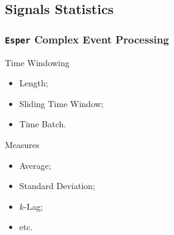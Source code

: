 \documentclass[aspectratio=169]{beamer}
\begin{document}
  \subsection{Signals Statistics}
  \begin{frame}[foot]
    \frametitle{\texttt{Esper} Complex Event Processing}
    \begin{block}{Time Windowing}
      \begin{itemize}
        \item Length;
        \item Sliding Time Window;
        \item Time Batch.
      \end{itemize}
    \end{block}
    \begin{block}{Measures}
      \begin{itemize}
        \item Average;
        \item Standard Deviation;
        \item $k$-Lag;
        \item etc.\
      \end{itemize}
    \end{block}
  \end{frame}
\end{document}
